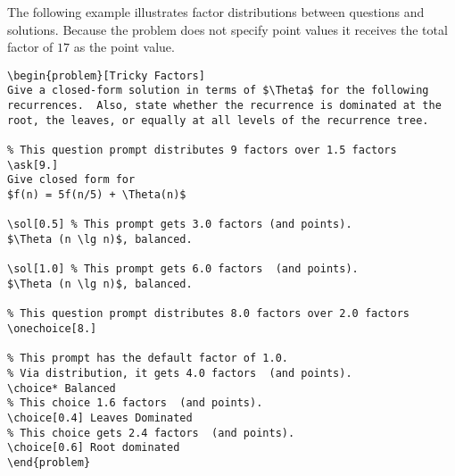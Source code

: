 \begin{cluster}
\label{grp:xmpl:quiz::illustrates}

\begin{example}
\label{xmpl:quiz::illustrates}
The following example illustrates factor distributions between
questions and solutions.  Because the problem does not specify point
values it receives the total factor of $17$ as the point value.

\begin{lstlisting}
\begin{problem}[Tricky Factors]
Give a closed-form solution in terms of $\Theta$ for the following
recurrences.  Also, state whether the recurrence is dominated at the
root, the leaves, or equally at all levels of the recurrence tree.

% This question prompt distributes 9 factors over 1.5 factors
\ask[9.]
Give closed form for  
$f(n) = 5f(n/5) + \Theta(n)$

\sol[0.5] % This prompt gets 3.0 factors (and points).
$\Theta (n \lg n)$, balanced.

\sol[1.0] % This prompt gets 6.0 factors  (and points).
$\Theta (n \lg n)$, balanced.

% This question prompt distributes 8.0 factors over 2.0 factors 
\onechoice[8.] 

% This prompt has the default factor of 1.0.
% Via distribution, it gets 4.0 factors  (and points). 
\choice* Balanced 
% This choice 1.6 factors  (and points).
\choice[0.4] Leaves Dominated  
% This choice gets 2.4 factors  (and points).
\choice[0.6] Root dominated   
\end{problem}
\end{lstlisting}

\end{example}
\end{cluster}

